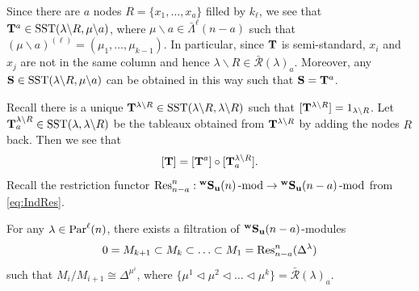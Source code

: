 Since there are $a$ nodes $R=\{x_1,\ldots, x_a\}$ filled by $k_{\ell}$, we see that  $\mathbf{T}^a\in \text{SST}(\lambda\backslash R, \mu\backslash a ) $, where $\mu\backslash a\in \bar\Lambda^{\ell}(n-a)$ such that $(\mu\backslash a)^{(\ell)}=(\mu_1,\ldots,\mu_{k-1})$. In particular, 
since $\mathbf{T}$ is semi-standard, $x_i$ and $x_j$ are not in the same column and hence $\lambda\backslash R\in \bar {\mathcal R}(\lambda)_a$. Moreover, any $\mathbf{S}\in \text{SST}(\lambda\backslash R, \mu\backslash a )$
can be obtained in this way such that $\mathbf{S}=\mathbf{T}^a$.

Recall there is a unique $\mathbf{T}^{\lambda\backslash R}\in \text{SST}(\lambda\backslash R, \lambda\backslash R) $ such that $ [\mathbf{T}^{\lambda\backslash R}]=1_{\lambda\backslash R}$.
Let $\mathbf{T}^{\lambda\backslash R}_a \in \text{SST}(\lambda,\lambda\backslash R)$ be the tableaux obtained from $\mathbf{T}^{\lambda\backslash R}$  by adding the nodes  $R$ back. 
Then we see that 
\[
[\mathbf{T}]=[\mathbf{T}^a] \circ [\mathbf{T}_a^{\lambda\backslash R}]. 
\]
Recall the restriction functor $\operatorname{Res}\nolimits^n_{n-a}: {}^{\bold{w}}\bold{S}_{\mathbf{u}}(n)\operatorname{-mod}\nolimits \rightarrow{}^{\bold{w}}\bold{S}_{\mathbf{u}}(n-a)\operatorname{-mod}\nolimits$ from \eqref{eq:IndRes}.

\begin{proposition}  \label{prop:restriction}
    For any $\lambda\in \text{Par}^\ell(n)$, there exists a filtration of ${}^{\bold{w}}\bold{S}_{\mathbf{u}}(n-a)$-modules 
    \[0=M_{k+1}\subset M_k\subset \ldots \subset M_1=\operatorname{Res}\nolimits^n_{n-a} (\Delta^\lambda) \]
    such that $M_i/M_{i+1}\cong \Delta^{\mu^i}$, 
    where $\{\mu^1\lhd \mu^2\lhd\ldots\lhd\mu^k \}=\bar {\mathcal R}(\lambda)_a$. 
\end{proposition}

